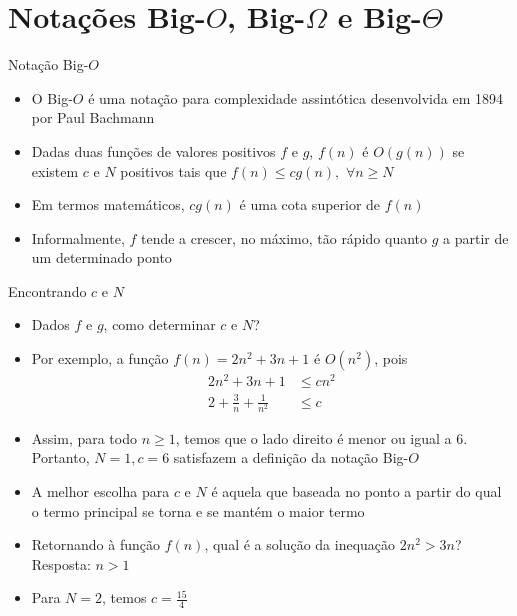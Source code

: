 \section{Notações Big-$O$, Big-$\Omega$ e Big-$\Theta$}

\begin{frame}[fragile]{Notação Big-$O$}

	\begin{itemize}
		\item O Big-$O$ é uma notação para complexidade 
		assintótica desenvolvida em 1894 por Paul Bachmann

		\item Dadas duas funções de {valores positivos} $f$ e 
		$g$, $f(n)$ é $O(g(n))$ se existem $c$ e $N$ positivos tais que
		$f(n) \leq cg(n),\, \, \forall n\geq N$

		\item Em termos matemáticos, $cg(n)$ é uma cota superior de $f(n)$

		\item Informalmente, $f$ tende a crescer, no máximo, tão rápido quanto $g$ a partir de um 
        determinado ponto
	\end{itemize}

\end{frame}

\begin{frame}[fragile]{Encontrando $c$ e $N$}

    \begin{itemize}
    \item Dados $f$ e $g$, como {determinar} $c$ e $N$?

    \item Por exemplo, a função $f(n) = 2n^2 + 3n + 1$ {é} $O(n^2)$, pois
    \begin{align*}
    2n^2 + 3n + 1 & \leq cn^2 \\
    2 + \frac{3}{n} + \frac{1}{n^2} & \leq c
    \end{align*}

	\item Assim, para todo $n \geq 1$, temos que o lado direito é menor ou igual a 6. Portanto,
    $N = 1, c = 6$ satisfazem a definição da notação Big-$O$

    \item A melhor escolha para $c$ e $N$ é aquela que baseada no ponto a partir do qual o termo 
    principal se torna e se mantém o maior termo

    \item Retornando à função $f(n)$, qual é a solução da inequação $2n^2 > 3n$? Resposta: $n > 1$

    \item Para $N = 2$, temos $c = \frac{15}{4}$
	\end{itemize}

\end{frame}

